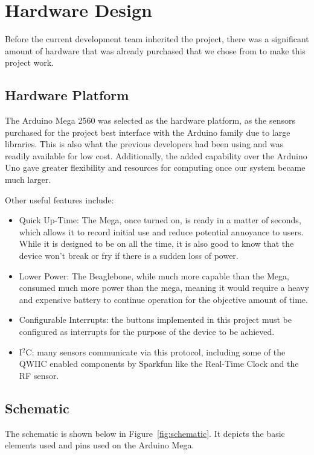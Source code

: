 \documentclass{article}
\begin{document}
\section{Hardware Design}
Before the current development team inherited the project, there was a significant amount of hardware that was already purchased that we chose from to make this project work. 

\subsection{Hardware Platform}
The Arduino Mega 2560 was selected as the hardware platform, as the sensors purchased for the project best interface with the Arduino family due to large libraries. This is also what the previous developers had been using and was readily available for low cost. Additionally, the added capability over the Arduino Uno gave greater flexibility and resources for computing once our system became much larger.  

Other useful features include: 
\begin{itemize}
	\item Quick Up-Time: The Mega, once turned on, is ready in a matter of seconds, which allows it to record initial use and reduce potential annoyance to users. While it is designed to be on all the time, it is also good to know that the device won't break or fry if there is a sudden loss of power. 
	\item Lower Power: The Beaglebone, while much more capable than the Mega, consumed much more power than the mega, meaning it would require a heavy and expensive battery to continue operation for the objective amount of time. 
	\item Configurable Interrupts: the buttons implemented in this project must be configured as interrupts for the purpose of the device to be achieved. 
	\item I$^2$C: many sensors communicate via this protocol, including some of the QWIIC enabled components by Sparkfun like the Real-Time Clock and the RF sensor. 
\end{itemize}

\subsection{Schematic}

The schematic is shown below in Figure~\ref{fig:schematic}. It depicts the basic elements used and pins used on the Arduino Mega.
\end{document}
